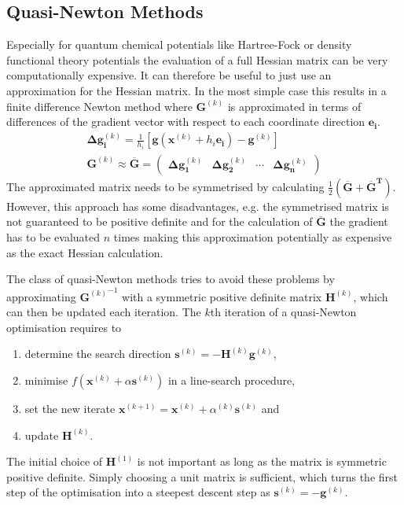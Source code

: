 \subsection{Quasi-Newton Methods}
\label{sec:QuasiNewtonMethods}

Especially for quantum chemical potentials like Hartree-Fock or density
functional theory potentials the evaluation of a full Hessian matrix can be
very computationally expensive. It can therefore be useful to just use an
approximation for the Hessian matrix. In the most simple case this results in a
finite difference Newton method where $\mathbf{G}^{(k)}$ is approximated in
terms of differences of the gradient vector with respect to each coordinate
direction $\mathbf{e_i}$.
%
\begin{align}
    {\bm{\Delta}\mathbf{g}}_\mathbf{i}^{(k)}=\frac{1}{h_i}\left[\mathbf{g}\left(\mathbf{x}^{(k)}+h_i\mathbf{e_i}\right)-\mathbf{g}^{(k)}\right]\\
    \mathbf{G}^{(k)}\approx \mathbf{\overline{G}}=
    \begin{pmatrix}
        \bm{\Delta}\mathbf{g}_\mathbf{1}^{(k)} & \bm{\Delta}\mathbf{g}_\mathbf{2}^{(k)} & \cdots & \bm{\Delta}\mathbf{g}_\mathbf{n}^{(k)}
    \end{pmatrix}
\end{align}
%
The approximated matrix needs to be symmetrised by calculating
$\frac{1}{2}\left(\mathbf{\overline{G}}+\mathbf{\overline{G}^T}\right)$. However, this
approach has some disadvantages, e.g. the symmetrised matrix is not guaranteed
to be positive definite and for the calculation of $\mathbf{\overline{G}}$ the
gradient has to be evaluated $n$ times making this approximation potentially as
expensive as the exact Hessian calculation.

The class of quasi-Newton methods tries to avoid these problems by
approximating ${\mathbf{G}^{(k)}}^{-1}$ with a symmetric positive definite
matrix $\mathbf{H}^{(k)}$, which can then be updated each iteration. The $k$th
iteration of a quasi-Newton optimisation requires to
%
\begin{enumerate}
    \item determine the search direction $\mathbf{s}^{(k)}=-\mathbf{H}^{(k)}\mathbf{g}^{(k)}$,
    \item minimise $f\left(\mathbf{x}^{(k)}+\alpha\mathbf{s}^{(k)}\right)$ in a line-search procedure,
    \item set the new iterate $\mathbf{x}^{(k+1)}=\mathbf{x}^{(k)}+\alpha^{(k)}\mathbf{s}^{(k)}$ and
    \item update $\mathbf{H}^{(k)}$.
\end{enumerate}
%
The initial choice of $\mathbf{H}^{(1)}$ is not important as long as the matrix
is symmetric positive definite. Simply choosing a unit matrix is sufficient,
which turns the first step of the optimisation into a steepest descent step as
$\mathbf{s}^{(k)}=-\mathbf{g}^{(k)}$.

